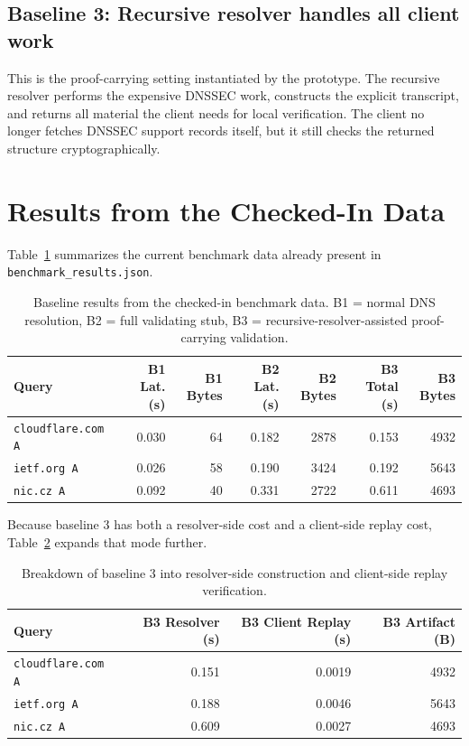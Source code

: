\documentclass[11pt]{article}
\begin{document}
\subsection*{Baseline 3: Recursive resolver handles all client work}

This is the proof-carrying setting instantiated by the prototype. The recursive resolver performs the expensive DNSSEC work, constructs the explicit transcript, and returns all material the client needs for local verification. The client no longer fetches DNSSEC support records itself, but it still checks the returned structure cryptographically.

\section{Results from the Checked-In Data}

Table~\ref{tab:results} summarizes the current benchmark data already present in \texttt{benchmark\_results.json}.

\begin{table}[h]
\centering
\begin{tabular}{lrrrrrr}
\toprule
Query & B1 Lat. (s) & B1 Bytes & B2 Lat. (s) & B2 Bytes & B3 Total (s) & B3 Bytes \\
\midrule
\texttt{cloudflare.com A} & 0.030 & 64   & 0.182 & 2878 & 0.153 & 4932 \\
\texttt{ietf.org A}       & 0.026 & 58   & 0.190 & 3424 & 0.192 & 5643 \\
\texttt{nic.cz A}         & 0.092 & 40   & 0.331 & 2722 & 0.611 & 4693 \\
\bottomrule
\end{tabular}
\caption{Baseline results from the checked-in benchmark data. B1 = normal DNS resolution, B2 = full validating stub, B3 = recursive-resolver-assisted proof-carrying validation.}
\label{tab:results}
\end{table}

Because baseline 3 has both a resolver-side cost and a client-side replay cost, Table~\ref{tab:proofdetail} expands that mode further.

\begin{table}[h]
\centering
\begin{tabular}{lrrr}
\toprule
Query & B3 Resolver (s) & B3 Client Replay (s) & B3 Artifact (B) \\
\midrule
\texttt{cloudflare.com A} & 0.151 & 0.0019 & 4932 \\
\texttt{ietf.org A}       & 0.188 & 0.0046 & 5643 \\
\texttt{nic.cz A}         & 0.609 & 0.0027 & 4693 \\
\bottomrule
\end{tabular}
\caption{Breakdown of baseline 3 into resolver-side construction and client-side replay verification.}
\label{tab:proofdetail}
\end{table}
\end{document}
